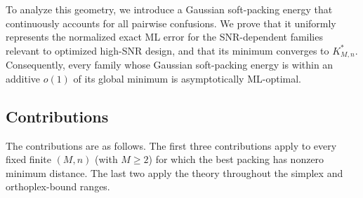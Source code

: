 \documentclass[12pt,draftclsnofoot,onecolumn]{IEEEtran}
\theoremstyle{definition}
\begin{document}
To analyze this geometry, we introduce a Gaussian soft-packing energy
that continuously accounts for all pairwise confusions.  We prove that
it uniformly represents the normalized exact ML error for the
SNR-dependent families relevant to optimized high-SNR design, and that
its minimum converges to \(K^{\ast}_{M,n}\).  Consequently, every
family whose Gaussian soft-packing energy is within an additive \(o(1)\)
of its global minimum is asymptotically ML-optimal.

\subsection{Contributions}
\label{subsec:contributions}

The contributions are as follows.  The first three contributions apply to every fixed
finite \((M,n)\) (with \(M\geq2\)) for which the best packing has nonzero
minimum distance.  The last two apply the theory throughout the simplex
and orthoplex-bound ranges.
\end{document}
